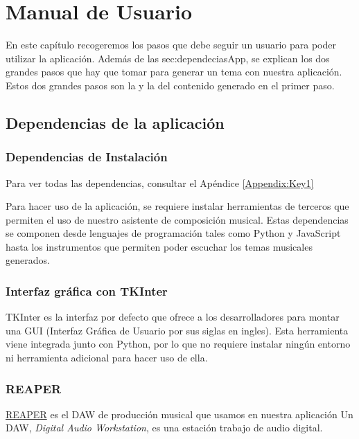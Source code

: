 \chapter{Manual de Usuario}
\label{cap:descripcionTrabajo}

En este capítulo recogeremos los pasos que debe seguir un usuario para poder utilizar la aplicación. Además de las \refname{sec:dependeciasApp}, se explican los dos grandes pasos que hay que tomar para generar un tema con nuestra aplicación. 
Estos dos grandes pasos son la  y la  del contenido generado en el primer paso. 

\section{Dependencias de la aplicación}
\label{sec:dependeciasApp}
\subsection{Dependencias de Instalación}
	Para ver todas las dependencias, consultar el Apéndice \ref{Appendix:Key1}

	Para hacer uso de la aplicación, se requiere instalar herramientas de terceros que permiten el uso de nuestro asistente de composición musical.
	Estas dependencias se componen desde lenguajes de programación tales como Python y JavaScript hasta los instrumentos que permiten poder escuchar los temas musicales generados.

\subsection{Interfaz gráfica con TKInter}
	TKInter es la interfaz por defecto que \PythonLink{} ofrece a los desarrolladores para montar una 
    GUI (Interfaz Gráfica de Usuario por sus siglas en ingles).
	Esta herramienta viene integrada junto con Python, por lo que no requiere instalar ningún entorno ni herramienta adicional para hacer uso de ella.



\subsection{REAPER}
\label{subsec:reaper}
	\href{https://www.reaper.fm/}{REAPER} es el DAW de producción musical que usamos en nuestra aplicación
	Un DAW, \textit{Digital Audio Workstation}, es una estación trabajo de audio digital.

